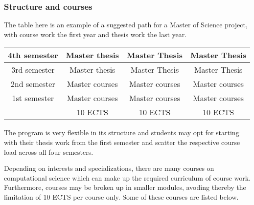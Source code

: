 \documentclass{beamer}
\begin{document}
\begin{frame}
\frametitle{Structure and courses}

\begin{block}{}
The table here is an example of a suggested path for a Master of Science project,
with course work the first year and thesis work the last year. 

{\footnotesize
\begin{tabular}{cccc}
\hline
\multicolumn{1}{c}{ 4th semester } & \multicolumn{1}{c}{ Master thesis } & \multicolumn{1}{c}{ Master Thesis } & \multicolumn{1}{c}{ Master Thesis } \\
\hline
3rd semester & Master thesis  & Master Thesis  & Master Thesis  \\
\hline
2nd semester & Master courses & Master courses & Master courses \\
\hline
1st semester & Master courses & Master courses & Master courses \\
\hline
             & 10 ECTS        & 10 ECTS        & 10 ECTS        \\
\hline
\end{tabular}
}

\noindent
The program is very flexible in its structure and students may opt for starting with their thesis 
work from the first semester and scatter the respective course load across all four semesters.

Depending on interests and specializations, there are many courses on computational science which can make 
up the required curriculum of course work. Furthermore, courses may be broken up in smaller modules,
avoding thereby the limitation of 10 ECTS per course only. Some of these courses are listed below.


\end{block}
\end{frame}
\end{document}

